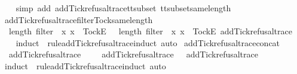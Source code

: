 %
\isadelimproof
\ \ %
\endisadelimproof
%
\isatagproof
{}\isamarkupfalse%
\ {\isacharparenleft}simp\ add{\isacharcolon}\ add{\isacharunderscore}Tick{\isacharunderscore}refusal{\isacharunderscore}trace{\isacharunderscore}tt{\isacharunderscore}subset\ tt{\isacharunderscore}subset{\isacharunderscore}same{\isacharunderscore}length{\isacharparenright}%
\endisatagproof
{\isafoldproof}%
%
\isadelimproof
\isanewline
%
\endisadelimproof
\isanewline
{}\isamarkupfalse%
\ add{\isacharunderscore}Tick{\isacharunderscore}refusal{\isacharunderscore}trace{\isacharunderscore}filter{\isacharunderscore}Tock{\isacharunderscore}same{\isacharunderscore}length{\isacharcolon}\isanewline
\ \ {\isachardoublequoteopen}length\ {\isacharparenleft}filter\ {\isacharparenleft}{\isasymlambda}\ x{\isachardot}\ x\ {\isacharequal}\ {\isacharbrackleft}Tock{\isacharbrackright}\isactrlsub E{\isacharparenright}\ {\isasymrho}{\isacharparenright}\ {\isacharequal}\ length\ {\isacharparenleft}filter\ {\isacharparenleft}{\isasymlambda}\ x{\isachardot}\ x\ {\isacharequal}\ {\isacharbrackleft}Tock{\isacharbrackright}\isactrlsub E{\isacharparenright}\ {\isacharparenleft}add{\isacharunderscore}Tick{\isacharunderscore}refusal{\isacharunderscore}trace\ {\isasymrho}{\isacharparenright}{\isacharparenright}{\isachardoublequoteclose}\isanewline
%
\isadelimproof
\ \ %
\endisadelimproof
%
\isatagproof
{}\isamarkupfalse%
\ {\isacharparenleft}induct\ {\isasymrho}\ rule{\isacharcolon}add{\isacharunderscore}Tick{\isacharunderscore}refusal{\isacharunderscore}trace{\isachardot}induct{\isacharcomma}\ auto{\isacharparenright}%
\endisatagproof
{\isafoldproof}%
%
\isadelimproof
\isanewline
%
\endisadelimproof
\isanewline
{}\isamarkupfalse%
\ add{\isacharunderscore}Tick{\isacharunderscore}refusal{\isacharunderscore}trace{\isacharunderscore}concat{\isacharcolon}\isanewline
\ \ {\isachardoublequoteopen}add{\isacharunderscore}Tick{\isacharunderscore}refusal{\isacharunderscore}trace\ {\isacharparenleft}{\isasymrho}\ {\isacharat}\ {\isasymsigma}{\isacharparenright}\ {\isacharequal}\ add{\isacharunderscore}Tick{\isacharunderscore}refusal{\isacharunderscore}trace\ {\isasymrho}\ {\isacharat}\ add{\isacharunderscore}Tick{\isacharunderscore}refusal{\isacharunderscore}trace\ {\isasymsigma}{\isachardoublequoteclose}\isanewline
%
\isadelimproof
\ \ %
\endisadelimproof
%
\isatagproof
{}\isamarkupfalse%
\ {\isacharparenleft}induct\ {\isasymrho}\ rule{\isacharcolon}add{\isacharunderscore}Tick{\isacharunderscore}refusal{\isacharunderscore}trace{\isachardot}induct{\isacharcomma}\ auto{\isacharparenright}%
